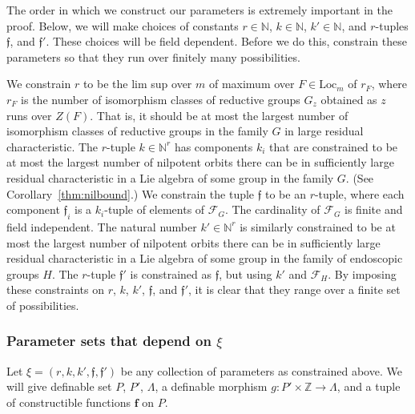 \documentclass[12pt]{amsart}
\newcommand{\ring}[1]{{\mathbb #1}}
\def\s{{\mathfrak{f}}}
\def\bf{\mathbf f}
\newcommand{\cF}{\mathcal{F}}
\newcommand{\Loc}{\mathrm{Loc}}
\theoremstyle{plain}
\theoremstyle{definition}
\begin{document}
The order in which we construct our parameters is extremely important
in the proof.  Below, we will make choices of constants
$r\in\ring{N}$, $k\in\ring{N}$, $k'\in\ring{N}$, and $r$-tuples $\s$,
and $\s'$.  These choices will be field dependent.  Before we do this,
constrain these parameters so that they run over finitely many
possibilities.

We constrain $r$ to be the lim sup over $m$ of maximum over
$F\in\Loc_m$ of $r_F$, where $r_F$ is the number of isomorphism
classes of reductive groups $G_z$ obtained as $z$ runs over $Z(F)$.
That is, it should be at most the largest number of isomorphism
classes of reductive groups in the family $G$ in large residual
characteristic.  The $r$-tuple $k\in\ring{N}^r$ has components $k_i$
that are constrained to be at most the largest number of nilpotent
orbits there can be in sufficiently large residual characteristic in a
Lie algebra of some group in the family $G$.  (See
Corollary~\ref{thm:nilbound}.) We constrain the tuple $\s$ to be an
$r$-tuple, where each component $\s_i$ is a $k_i$-tuple of
elements of $\cF_G$. The cardinality of $\cF_G$ is finite and field
independent.  The natural number $k'\in\ring{N}^r$ is similarly
constrained to be at most the largest number of nilpotent orbits there
can be in sufficiently large residual characteristic in a Lie algebra
of some group in the family of endoscopic groups $H$.  The $r$-tuple
$\s'$ is constrained as $\s$, but using $k'$ and $\cF_H$.  By imposing
these constraints on $r$, $k$, $k'$, $\s$, and $\s'$, it is clear that
they range over a finite set of possibilities.




\subsubsection{Parameter sets that depend on $\xi$}

Let $\xi=(r,k,k',\s,\s')$ be any collection of parameters as constrained above.  
We will give definable set $P$, $P'$, $\Lambda$, a definable
morphism $g:P'\times\ring{Z}\to \Lambda$, and a tuple of
constructible functions $\bf$ on $P$.
\end{document}
